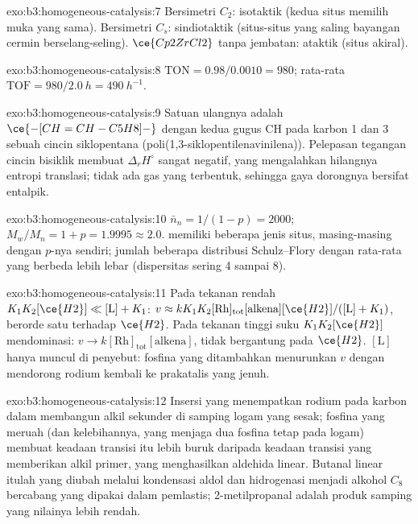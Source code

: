 \begin{solution}{exo:b3:homogeneous-catalysis:7}
Bersimetri $C_2$: isotaktik (kedua situs memilih muka yang sama). Bersimetri $C_s$:
sindiotaktik (situs-situs yang saling bayangan cermin berselang-seling). $\ce{Cp2ZrCl2}$ tanpa jembatan: ataktik (situs
akiral).
\end{solution}

\begin{solution}{exo:b3:homogeneous-catalysis:8}
$\mathrm{TON} = 0.98/0.0010 = 980$; rata-rata $\mathrm{TOF} = 980/\qty{2.0}{h} = \qty{490}{h^{-1}}$.
\end{solution}

\begin{solution}{exo:b3:homogeneous-catalysis:9}
Satuan ulangnya adalah $\ce{-[CH=CH-C5H8]-}$ dengan kedua gugus CH pada karbon 1 dan 3 sebuah
cincin siklopentana (poli(1,3-siklopentilenavinilena)). Pelepasan tegangan
cincin bisiklik membuat $\Delta_rH^\circ$ sangat negatif, yang mengalahkan hilangnya
entropi translasi; tidak ada gas yang terbentuk, sehingga gaya dorongnya bersifat
entalpik.
\end{solution}

\begin{solution}{exo:b3:homogeneous-catalysis:10}
$\bar n_n = 1/(1 - p) = 2000$; $M_w/M_n = 1 + p = 1.9995 \approx 2.0$.  memiliki
beberapa jenis situs, masing-masing dengan $p$-nya sendiri; jumlah beberapa distribusi Schulz--Flory
dengan rata-rata yang berbeda lebih lebar (dispersitas sering 4 sampai 8).
\end{solution}

\begin{solution}{exo:b3:homogeneous-catalysis:11}
Pada tekanan rendah $K_1K_2[\ce{H2}] \ll [\mathrm L] + K_1$: $v \approx kK_1K_2[\mathrm{Rh}]_{\mathrm{tot}}[\text{alkena}][\ce{H2}]/([\mathrm L] + K_1)$,
berorde satu terhadap $\ce{H2}$. Pada tekanan tinggi suku $K_1K_2[\ce{H2}]$ mendominasi: $v \to k[\mathrm{Rh}]_{\mathrm{tot}}[\text{alkena}]$,
tidak bergantung pada $\ce{H2}$. $[\mathrm L]$ hanya muncul di penyebut: fosfina yang ditambahkan menurunkan $v$
dengan mendorong rodium kembali ke prakatalis yang jenuh.
\end{solution}

\begin{solution}{exo:b3:homogeneous-catalysis:12}
Insersi yang menempatkan rodium pada karbon dalam membangun alkil sekunder
di samping logam yang sesak; fosfina yang meruah (dan kelebihannya, yang menjaga dua fosfina
tetap pada logam) membuat keadaan transisi itu lebih buruk daripada keadaan transisi yang memberikan alkil
primer, yang menghasilkan aldehida linear. Butanal linear itulah yang diubah melalui
kondensasi aldol dan hidrogenasi menjadi alkohol $C_8$ bercabang yang dipakai dalam
pemlastis; 2-metilpropanal adalah produk samping yang nilainya lebih rendah.
\end{solution}

